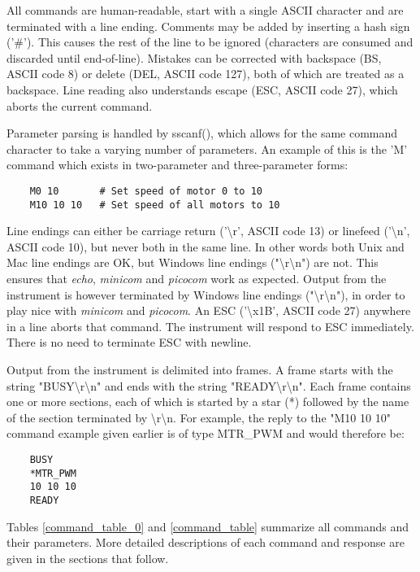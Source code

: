 \documentclass{article}
\begin{document}
All commands are human-readable, start with a single ASCII character and are terminated with a line ending.
Comments may be added by inserting a hash sign ('\#').
This causes the rest of the line to be ignored (characters are consumed and discarded until end-of-line).
Mistakes can be corrected with backspace (BS, ASCII code 8) or delete (DEL, ASCII code 127), both of which are treated as a backspace.
Line reading also understands escape (ESC, ASCII code 27), which aborts the current command.

Parameter parsing is handled by sscanf(), which allows for the same command character to take a varying number
of parameters. An example of this is the 'M' command which exists in two-parameter and three-parameter forms:

\begin{lstlisting}
    M0 10       # Set speed of motor 0 to 10
    M10 10 10   # Set speed of all motors to 10
\end{lstlisting}


Line endings can either be carriage return ('{\textbackslash}r', ASCII code 13) or linefeed ('{\textbackslash}n', ASCII code 10), but never both in the same line.
In other words both Unix and Mac line endings are OK, but Windows line endings ("{\textbackslash}r{\textbackslash}n") are not.
This ensures that {\it echo}, {\it minicom} and {\it picocom} work as expected.
Output from the instrument is however terminated by Windows line endings ("{\textbackslash}r{\textbackslash}n"), in order to play nice with {\it minicom} and {\it picocom}.
An ESC ('{\textbackslash}x1B', ASCII code 27) anywhere in a line aborts that command.
The instrument will respond to ESC immediately.
There is no need to terminate ESC with newline.

Output from the instrument is delimited into frames.
A frame starts with the string "BUSY{\textbackslash}r{\textbackslash}n" and ends with the string "READY{\textbackslash}r{\textbackslash}n".
Each frame contains one or more sections, each of which is started by a star (*) followed by the name of the section terminated by {\textbackslash}r{\textbackslash}n.
For example, the reply to the "M10 10 10" command example given earlier is of type MTR\_PWM and would therefore be:

\begin{lstlisting}
    BUSY
    *MTR_PWM
    10 10 10
    READY
\end{lstlisting}

Tables \ref{command_table_0} and \ref{command_table} summarize all commands and their parameters.
More detailed descriptions of each command and response are given in the sections that follow.
\end{document}
